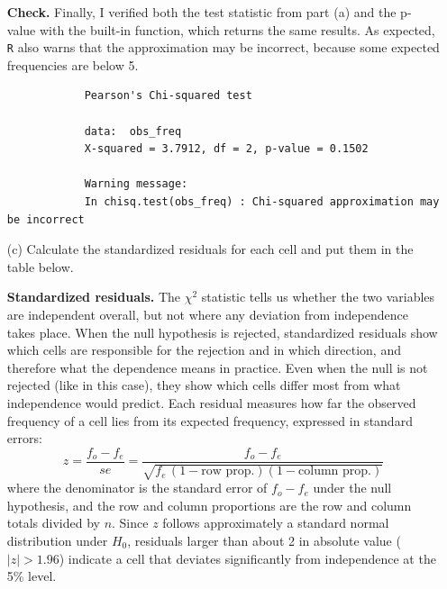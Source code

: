 \documentclass[12pt,letterpaper]{article}
\begin{document}
\begin{enumerate}
		\vspace{.25cm}
		\noindent\textbf{Check.} Finally, I verified both the test statistic from part (a) and the p-value with the built-in function, which returns the same results. As expected, \texttt{R} also warns that the approximation may be incorrect, because some expected frequencies are below 5.
		
		
		
		\begin{verbatim}
			Pearson's Chi-squared test
			
			data:  obs_freq
			X-squared = 3.7912, df = 2, p-value = 0.1502
			
			Warning message:
			In chisq.test(obs_freq) : Chi-squared approximation may be incorrect
		\end{verbatim}
		
		\item [(c)] Calculate the standardized residuals for each cell and put them in the table below.
		
		\vspace{.25cm}
		\noindent\textbf{Standardized residuals.} The $\chi^2$ statistic tells us whether the two variables are independent overall, but not where any deviation from independence takes place. When the null hypothesis is rejected, standardized residuals show which cells are responsible for the rejection and in which direction, and therefore what the dependence means in practice. Even when the null is not rejected (like in this case), they show which cells differ most from what independence would predict. Each residual measures how far the observed frequency of a cell lies from its expected frequency, expressed in standard errors:
		\begin{equation*}
			z = \frac{f_o - f_e}{se} = \frac{f_o - f_e}{\sqrt{f_e\,(1 - \text{row prop.})(1 - \text{column prop.})}}
		\end{equation*}
		where the denominator is the standard error of $f_o - f_e$ under the null hypothesis, and the row and column proportions are the row and column totals divided by $n$. Since $z$ follows approximately a standard normal distribution under $H_0$, residuals larger than about 2 in absolute value ($|z| > 1.96$) indicate a cell that deviates significantly from independence at the 5\% level.
		
		
		
		
		

\end{enumerate}
\end{document}
